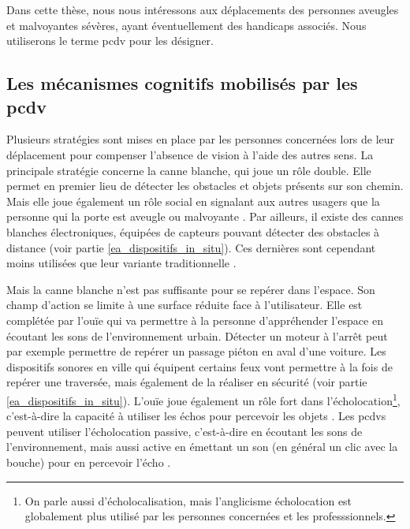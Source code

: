\newpar{}

Dans cette thèse, nous nous intéressons aux déplacements des personnes aveugles et malvoyantes sévères, ayant éventuellement des handicaps associés. Nous utiliserons le terme \gls{pcdv} pour les désigner.

\subsection{Les mécanismes cognitifs mobilisés par les \gls{pcdv}}

%
%

Plusieurs stratégies sont mises en place par les personnes concernées lors de leur déplacement pour compenser l'absence de vision à l'aide des autres sens. La principale stratégie concerne la canne blanche, qui joue un rôle double. Elle permet en premier lieu de détecter les obstacles et objets présents sur son chemin. Mais elle joue également un rôle social en signalant aux autres usagers que la personne qui la porte est aveugle ou malvoyante \citep{ratelle_manuel_2019}. Par ailleurs, il existe des cannes blanches électroniques, équipées de capteurs pouvant détecter des obstacles à distance (voir partie \ref{ea_dispositifs_in_situ}). Ces dernières sont cependant moins utilisées que leur variante traditionnelle \citep{homere_2023}. 

\newpar{}

Mais la canne blanche n'est pas suffisante pour se repérer dans l'espace. Son champ d'action se limite à une surface réduite face à l'utilisateur. Elle est complétée par l'ouïe qui va permettre à la personne d'appréhender l'espace en écoutant les sons de l'environnement urbain. Détecter un moteur à l'arrêt peut par exemple permettre de repérer un passage piéton en aval d'une voiture. Les dispositifs sonores en ville qui équipent certains feux vont permettre à la fois de repérer une traversée, mais également de la réaliser en sécurité (voir partie \ref{ea_dispositifs_in_situ}). L'ouïe joue également un rôle fort dans l'écholocation\footnote{On parle aussi d'écholocalisation, mais l'anglicisme écholocation est globalement plus utilisé par les personnes concernées et les professsionnels.}, c’est-à-dire la capacité à utiliser les échos pour percevoir les objets \citep{Brazier2008}. Les \glspl{pcdv} peuvent utiliser l'écholocation passive, c'est-à-dire en écoutant les sons de l'environnement, mais aussi active en émettant un son (en général un clic avec la bouche) pour en percevoir l'écho \citep{thaler2016}.

